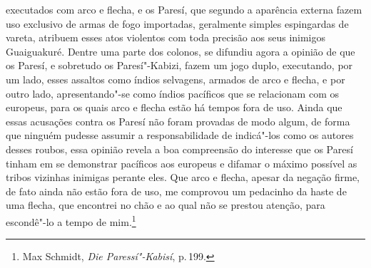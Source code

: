executados com arco e flecha, e os Paresí, que segundo a aparência
externa fazem uso exclusivo de armas de fogo importadas, geralmente
simples espingardas de vareta, atribuem esses atos violentos com toda
precisão aos seus inimigos Guaiguakuré. Dentre uma parte dos colonos,
se difundiu agora a opinião de que os Paresí, e sobretudo os
Paresí"-Kabizi, fazem um jogo duplo, executando, por um lado, esses
assaltos como índios selvagens, armados de arco e flecha, e por outro
lado, apresentando"-se como índios pacíficos que se relacionam com os
europeus, para os quais arco e flecha estão há tempos fora de uso. Ainda
que essas acusações contra os Paresí não foram provadas de modo algum,
de forma que ninguém pudesse assumir a responsabilidade de indicá"-los
como os autores desses roubos, essa opinião revela a boa compreensão do
interesse que os Paresí tinham em se demonstrar pacíficos aos europeus
e difamar o máximo possível as tribos vizinhas inimigas perante eles.
Que arco e flecha, apesar da negação firme, de fato ainda não estão fora
de uso, me comprovou um pedacinho da haste de uma flecha, que encontrei
no chão e ao qual não se prestou atenção, para escondê"-lo a tempo de
mim.\footnote{Max Schmidt, \textit{Die Paressí"-Kabisí}, p.\,199.}

